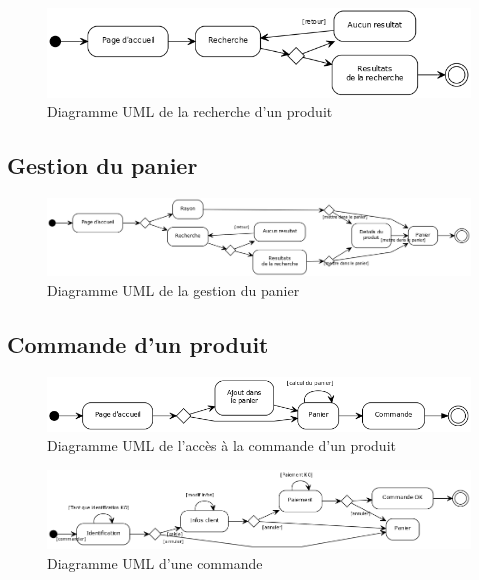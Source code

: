 \documentclass[12pt]{article}
\begin{document}
\begin{figure}[ht]
    \center
    \includegraphics[scale=0.6]{../Diagrams/ActivityDiagrams/recherche.png}
    \caption*{Diagramme UML de la recherche d'un produit}
\end{figure}

\subsection{Gestion du panier}

\begin{figure}[ht]
    \center
    \includegraphics[scale=0.4]{../Diagrams/ActivityDiagrams/panier.png}
    \caption*{Diagramme UML de la gestion du panier}
\end{figure}

\subsection{Commande d'un produit}

\begin{figure}[ht]
    \center
    \includegraphics[scale=0.55]{../Diagrams/ActivityDiagrams/commande_global.png}
    \caption*{Diagramme UML de l'accès à la commande d'un produit}
\end{figure}

\begin{figure}[ht]
    \center
    \includegraphics[scale=0.45]{../Diagrams/ActivityDiagrams/commande_en_cours.png}
    \caption*{Diagramme UML d'une commande}
\end{figure}
\end{document}
